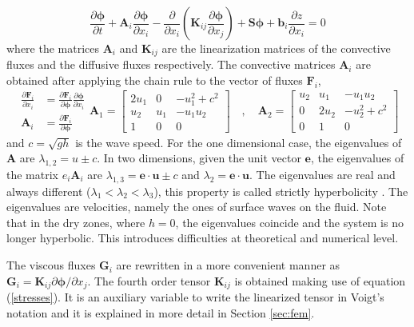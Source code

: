 \documentclass[a4paper,12pt]{elsarticle}
\newcommand{\pder}[2]{\frac{\partial#1}{\partial#2}}
\begin{document}
\begin{equation}
\pder{\bm{\phi}}{t} + \mathbf{A}_i\pder{\bm{\phi}}{x_i}
 - \pder{}{x_{i}}\left(\mathbf{K}_{ij}\pder{\bm{\phi}}{x_j}\right) + \mathbf{S}\bm{\phi} + \mathbf{b}_i\pder{z}{x_i} = 0
\end{equation}
where the matrices $\mathbf{A}_i$ and $\mathbf{K}_{ij}$ are the linearization matrices of the convective fluxes and the diffusive fluxes respectively. The convective matrices $\mathbf{A}_i$ are obtained after applying the chain rule to the vector of fluxes $\mathbf{F}_i$,
\begin{subequations}
\begin{align}
\pder{\mathbf{F}_i}{x_i} &= \pder{\mathbf{F}_i}{\bm{\phi}}\pder{\bm{\phi}}{x_i} \\
\mathbf{A}_i &= \pder{\mathbf{F}_i}{\bm{\phi}}
\end{align}
\begin{equation}
\mathbf{A}_1 = \left[\begin{matrix}
        2u_1 & 0   & -u_1^2 + c^2 \\
        u_2  & u_1 & -u_1 u_2 \\
        1    & 0   & 0
    \end{matrix} \right]
\quad , \quad
\mathbf{A}_2 = \left[\begin{matrix}
        u_2 & u_1  & -u_1 u_2 \\
        0   & 2u_2 & -u_2^2 + c^2 \\
        0   & 1    & 0
    \end{matrix} \right]
\end{equation}
\end{subequations}
and $c=\sqrt{gh}$ is the wave speed.
For the one dimensional case, the eigenvalues of $\mathbf{A}$ are $\lambda_{1,2}=u\pm c$.
In two dimensions, given the unit vector $\mathbf{e}$, the eigenvalues of the matrix $e_i \mathbf{A}_i$ are $\lambda_{1,3} = \mathbf{e}\cdot\mathbf{u} \pm c$ and $\lambda_2 = \mathbf{e}\cdot\mathbf{u}$.
The eigenvalues are real and always different ($\lambda_1<\lambda_2<\lambda_3$), this property is called strictly hyperbolicity \cite{raviart1996}. The eigenvalues are velocities, namely the ones of surface waves on the fluid. Note that in the dry zones, where ${h=0}$, the eigenvalues coincide and the system is no longer hyperbolic. This introduces difficulties at theoretical and numerical level.


The viscous fluxes $\mathbf{G}_i$ are rewritten in a more convenient manner as ${\mathbf{G}_i = \mathbf{K}_{ij} \partial\bm{\phi}/\partial x_j}$. The fourth order tensor $\mathbf{K}_{ij}$ is obtained making use of equation (\ref{stresses}). It is an auxiliary variable to write the linearized tensor in Voigt's notation and it is explained in more detail in Section \ref{sec:fem}.
\end{document}

